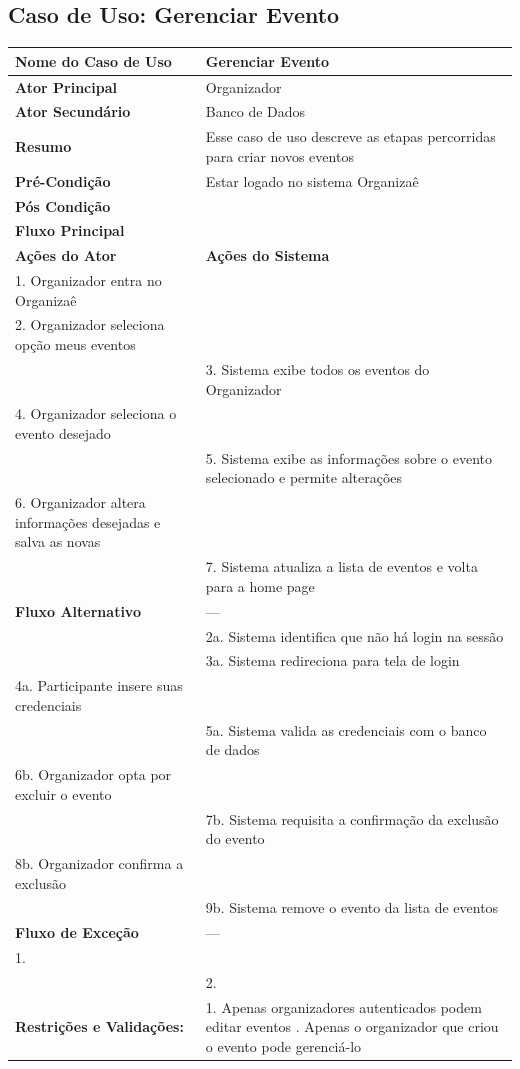 \documentclass[12pt,a4paper]{article}
\begin{document}
\newpage

\subsection{Caso de Uso: Gerenciar Evento}
\begin{longtable}{|p{4cm}|p{11cm}|}
\hline
\textbf{Nome do Caso de Uso} & Gerenciar Evento \\ \hline
\textbf{Ator Principal} & Organizador \\ \hline
\textbf{Ator Secundário} & Banco de Dados \\ \hline
\textbf{Resumo} & Esse caso de uso descreve as etapas percorridas para criar novos eventos \\ \hline
\textbf{Pré-Condição} & Estar logado no sistema Organizaê \\ \hline
\textbf{Pós Condição} & \\ \hline
\textbf{Fluxo Principal} & \\ \hline
\textbf{Ações do Ator} & \textbf{Ações do Sistema} \\ \hline
1. Organizador entra no Organizaê & \\ \hline
2. Organizador seleciona opção meus eventos & \\ \hline
& 3. Sistema exibe todos os eventos do Organizador \\ \hline
4. Organizador seleciona o evento desejado & \\ \hline
& 5. Sistema exibe as informações sobre o evento selecionado e permite alterações \\ \hline
6. Organizador altera informações desejadas e salva as novas & \\ \hline
& 7. Sistema atualiza a lista de eventos e volta para a home page \\ \hline
\textbf{Fluxo Alternativo} & --- \\ \hline
& 2a. Sistema identifica que não há login na sessão \\ \hline
& 3a. Sistema redireciona para tela de login \\ \hline
4a. Participante insere suas credenciais & \\ \hline
& 5a. Sistema valida as credenciais com o banco de dados \\ \hline
6b. Organizador opta por excluir o evento & \\ \hline
& 7b. Sistema requisita a confirmação da exclusão do evento \\ \hline
8b. Organizador confirma a exclusão & \\ \hline
& 9b. Sistema remove o evento da lista de eventos \\ \hline
\textbf{Fluxo de Exceção} & --- \\ \hline
1. & \\ \hline
& 2. \\ \hline

\textbf{Restrições e Validações:} & 1. Apenas organizadores autenticados podem editar eventos 
\newline 2. Apenas o organizador que criou o evento pode gerenciá-lo \\ \hline
\end{longtable}
\end{document}
